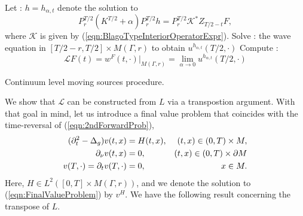\documentclass[final,leqno]{siamart1116}
\begin{document}
\begin{algorithm}
  \begin{algorithmic}
    \STATE Let : $h = h_{\alpha,t}$ denote the solution to 
    \begin{equation*}
      P_r^{T/2}(K^{T/2} + \alpha) P_r^{T/2} h = P_r^{T/2} {\mathcal{K}}^* Z_{T/2 - t}F,
    \end{equation*}
    where ${\mathcal{K}}$ is given by (\ref{eqn:BlagoTypeInteriorOperatorExpr}).
    \STATE Solve : the wave equation in $[T/2-r,T/2] \times M(\Gamma,r)$ to obtain $u^{h_{\alpha,t}}(T/2,\cdot)$
    \ENDFOR
    \STATE Compute :
    \begin{equation*}
      {\mathcal{L}} F(t) = w^F(t,\cdot)|_{M(\Gamma,r)} = \lim_{\alpha \rightarrow 0} u^{h_{\alpha,t}}(T/2,\cdot)
    \end{equation*}
    \ENDFOR
    \ENDFOR
  \end{algorithmic}
  \caption{
    \label{algo:movingSources}
    Continuum level moving sources procedure.}
\end{algorithm}

We show that ${\mathcal{L}}$ can be constructed from $L$ via a transpostion
argument. With that goal in mind, let us introduce a final value problem
that coincides with the time-reversal of (\ref{eqn:2ndForwardProb}),
\begin{align}
  \label{eqn:FinalValueProblem}
  (\partial_t^2 - {\Delta_{g}}) v(t,x) &= H(t,x), & (t,x) \in (0, T) \times M,\\ 
  {{\partial}_{\nu}} v(t,x) &= 0, & (t,x) \in(0,T) \times {\partial} M \notag\\
  v(T,\cdot) = \partial_t v(T,\cdot) &= 0, & x \in M. \notag
\end{align}
Here, $H \in L^2([0,T] \times M(\Gamma,r))$, and we denote the
solution to (\ref{eqn:FinalValueProblem}) by $v^H$. We have the
following result concerning the transpose of $L$.
\end{document}
